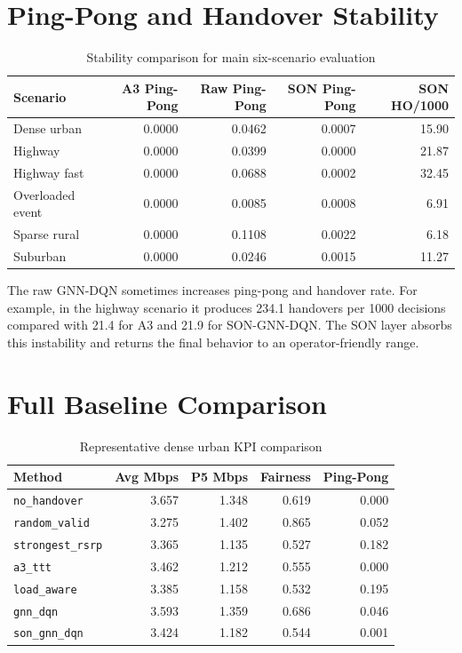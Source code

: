\documentclass[12pt,a4paper]{report}
\newcommand{\method}{\texttt{son\_gnn\_dqn}}
\newcommand{\rawmethod}{\texttt{gnn\_dqn}}
\begin{document}
\section{Ping-Pong and Handover Stability}
\begin{table}[H]
\centering
\caption{Stability comparison for main six-scenario evaluation}
\begin{tabularx}{\textwidth}{p{}r r r r}
\toprule
\textbf{Scenario} & \textbf{A3 Ping-Pong} & \textbf{Raw Ping-Pong} & \textbf{SON Ping-Pong} & \textbf{SON HO/1000}\\
\midrule
Dense urban & 0.0000 & 0.0462 & 0.0007 & 15.90\\
Highway & 0.0000 & 0.0399 & 0.0000 & 21.87\\
Highway fast & 0.0000 & 0.0688 & 0.0002 & 32.45\\
Overloaded event & 0.0000 & 0.0085 & 0.0008 & 6.91\\
Sparse rural & 0.0000 & 0.1108 & 0.0022 & 6.18\\
Suburban & 0.0000 & 0.0246 & 0.0015 & 11.27\\
\bottomrule
\end{tabularx}
\end{table}

The raw GNN-DQN sometimes increases ping-pong and handover rate. For example, in the highway scenario it produces 234.1 handovers per 1000 decisions compared with 21.4 for A3 and 21.9 for SON-GNN-DQN. The SON layer absorbs this instability and returns the final behavior to an operator-friendly range.

\section{Full Baseline Comparison}
\begin{table}[H]
\centering
\caption{Representative dense urban KPI comparison}
\begin{tabularx}{\textwidth}{p{}r r r r}
\toprule
\textbf{Method} & \textbf{Avg Mbps} & \textbf{P5 Mbps} & \textbf{Fairness} & \textbf{Ping-Pong}\\
\midrule
\texttt{no\_handover} & 3.657 & 1.348 & 0.619 & 0.000\\
\texttt{random\_valid} & 3.275 & 1.402 & 0.865 & 0.052\\
\texttt{strongest\_rsrp} & 3.365 & 1.135 & 0.527 & 0.182\\
\texttt{a3\_ttt} & 3.462 & 1.212 & 0.555 & 0.000\\
\texttt{load\_aware} & 3.385 & 1.158 & 0.532 & 0.195\\
\rawmethod & 3.593 & 1.359 & 0.686 & 0.046\\
\method & 3.424 & 1.182 & 0.544 & 0.001\\
\bottomrule
\end{tabularx}
\end{table}
\end{document}
